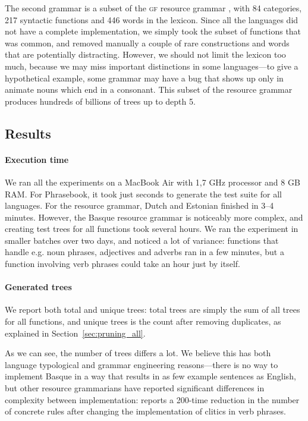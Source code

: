 \documentclass[11pt]{article}
\def\gf{\textsc{gf}}
\begin{document}
The second grammar is a subset of the \gf{} resource
grammar \cite{ranta2009rgl}, with 84 categories, 217 syntactic
functions and 446 words in the lexicon. Since all the languages did
not have a complete implementation, we simply took the subset of functions that was
common, and removed manually a couple of rare constructions and words
that are potentially distracting. However, we should not limit the
lexicon too much, because we may miss important distinctions  in some
languages---to give a hypothetical example, some grammar may have a
bug that shows up only in animate nouns which end in a consonant. This
subset of the resource grammar produces hundreds of billions of trees
up to depth 5.
\subsection{Results}

\paragraph{Execution time} We ran all the experiments on a MacBook Air
with 1,7 GHz processor and 8 GB RAM. For Phrasebook, it took just
seconds to generate the test suite for all languages. For the resource
grammar, Dutch and Estonian finished in 3--4 minutes. However, the
Basque resource grammar is noticeably more complex, and creating test
trees for all functions took several hours. We ran the experiment in
smaller batches over two days, and noticed a lot of variance:
functions that handle e.g. noun phrases, adjectives and adverbs ran in
a few minutes, but a function involving verb phrases could take an
hour just by itself.

\paragraph{Generated trees}

We report both total and unique trees: total trees are simply the sum
of all trees for all functions, and unique trees is the count after
removing duplicates, as explained in Section~\ref{sec:pruning_all}.

As we can see, the number of trees differs a lot. We believe this has
both language typological and grammar engineering reasons---there
is no way to implement Basque in a way that results in as few example
sentences as English, but other resource grammarians have reported
significant differences in complexity between implementation:
\cite{enache2010} reports a 200-time reduction in the number of
concrete rules after changing the implementation of clitics in verb
phrases.
\end{document}
